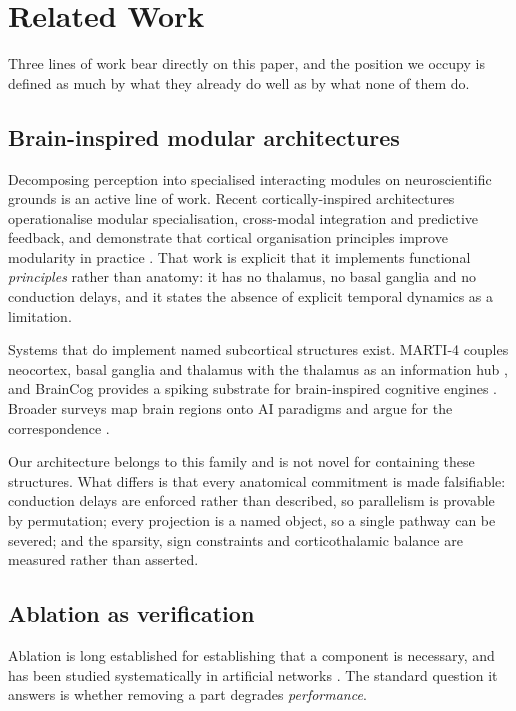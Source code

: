 \documentclass[conference]{IEEEtran}
\begin{document}
\section{Related Work}

Three lines of work bear directly on this paper, and the position we occupy is
defined as much by what they already do well as by what none of them do.

\subsection{Brain-inspired modular architectures}

Decomposing perception into specialised interacting modules on neuroscientific
grounds is an active line of work. Recent cortically-inspired architectures
operationalise modular specialisation, cross-modal integration and predictive
feedback, and demonstrate that cortical organisation principles improve
modularity in practice \cite{cortical2026}. That work is explicit that it
implements functional \emph{principles} rather than anatomy: it has no
thalamus, no basal ganglia and no conduction delays, and it states the absence
of explicit temporal dynamics as a limitation.

Systems that do implement named subcortical structures exist. MARTI-4 couples
neocortex, basal ganglia and thalamus with the thalamus as an information hub
\cite{marti4}, and BrainCog provides a spiking substrate for brain-inspired
cognitive engines \cite{braincog}. Broader surveys map brain regions onto AI
paradigms and argue for the correspondence \cite{surveyjin,agentagi}.

Our architecture belongs to this family and is not novel for containing these
structures. What differs is that every anatomical commitment is made
falsifiable: conduction delays are enforced rather than described, so
parallelism is provable by permutation; every projection is a named object, so
a single pathway can be severed; and the sparsity, sign constraints and
corticothalamic balance are measured rather than asserted.

\subsection{Ablation as verification}

Ablation is long established for establishing that a component is necessary,
and has been studied systematically in artificial networks
\cite{meyes2019}. The standard question it answers is whether removing a part
degrades \emph{performance}.
\end{document}
